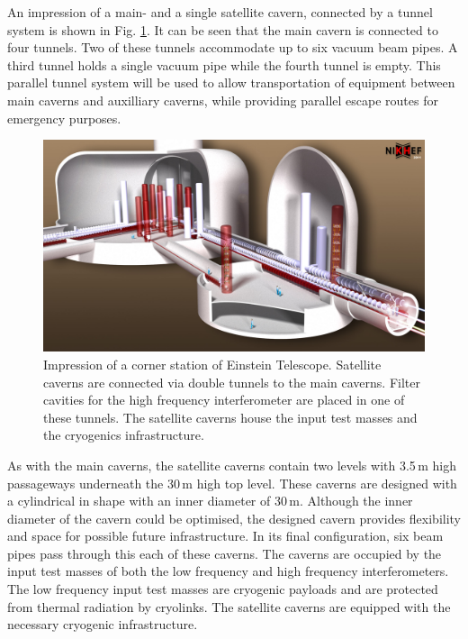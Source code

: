An impression of a main- and a single satellite cavern, connected by a tunnel system is shown in Fig. \ref{infra}. It can be seen that the main cavern is connected to four tunnels. Two of these tunnels accommodate up to six vacuum beam pipes. A third tunnel holds a single vacuum pipe while the fourth tunnel is empty. This parallel tunnel system will be used to allow transportation of equipment between main caverns and auxilliary caverns, while providing parallel escape routes for emergency purposes.

\begin{figure}[h!]
	\centering
		\includegraphics[width=17cm]{./Sec_SiteInfra/Figures/ArtisticView1.jpg}
		\caption{Impression of a corner station of Einstein Telescope. Satellite caverns are connected via double tunnels to the main caverns.  Filter cavities for the high frequency interferometer are placed in one of these tunnels. The satellite caverns house the input test masses and the cryogenics infrastructure.}
		\label{infra}
\end{figure}
As with the main caverns, the satellite caverns contain two levels with 3.5\,m high passageways underneath the 30\,m high top level. These caverns are designed with a cylindrical in shape with an inner diameter of 30\,m. Although the inner diameter of the cavern could be optimised, the designed cavern provides flexibility and space for possible future infrastructure. In its final configuration, six beam pipes pass through this each of these caverns. The caverns are occupied by the input test masses of both the low frequency and high frequency interferometers. The low frequency input test masses are cryogenic payloads and are protected from thermal radiation by cryolinks. The satellite caverns are equipped with the necessary cryogenic infrastructure. 

